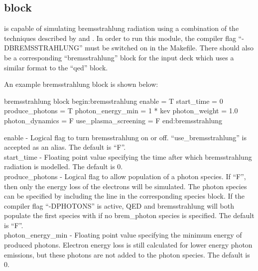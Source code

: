 \subsection{\texorpdfstring
  { block}
  {           {bremsstrahlung} block}}
\label{sec:bremsstrahlung_block}

{\EPOCH} is capable of simulating bremsstrahlung radiation using a combination
of the techniques described by \citet{Vyskocil2018} and \citet{Wu2018}. In
order to run this module, the compiler flag ``-DBREMSSTRAHLUNG'' must be
switched on in the Makefile. There should also be a corresponding
``bremsstrahlung'' block for the input deck which uses a similar
 format to the ``qed'' block.

An example bremsstrahlung block is shown below:

\begin{lboxverbatim}{bremsstrahlung block}
begin:bremsstrahlung
   enable = T
   start_time = 0
   produce_photons = T
   photon_energy_min = 1 * kev
   photon_weight = 1.0
   photon_dynamics = F
   use_plasma_screening = F
end:bremsstrahlung
\end{lboxverbatim}

{\emphtext enable} - Logical flag to turn bremsstrahlung on or off.
  ``use\_bremsstrahlung'' is accepted as an alias. The default is ``F''.\\

{\emphtext start\_time} - Floating point value specifying the time after
  which bremsstrahlung radiation is modelled. The default is 0.\\

{\emphtext produce\_photons} - Logical flag to allow population of a photon
  species. If ``F'', then only the energy loss of the electrons will be
  simulated. The photon species can be specified by including the line
   in the corresponding species block. If the
  compiler flag ``-DPHOTONS'' is active, QED and bremsstrahlung will both
  populate the first species with  if no
  brem\_photon species is specified. The default is ``F''.\\

{\emphtext photon\_energy\_min} - Floating point value specifying the minimum
  energy of produced photons. Electron energy loss is still calculated for
  lower energy photon emissions, but these photons are not added to the photon
  species. The default is 0.\\

